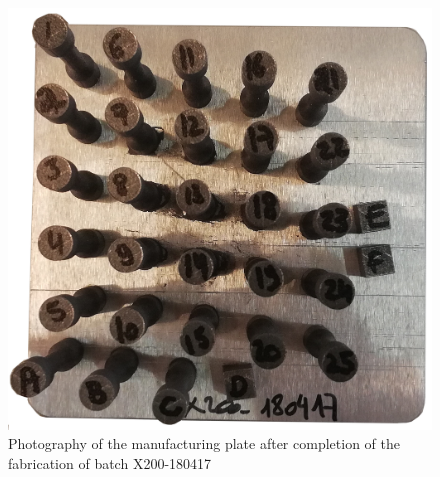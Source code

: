 \begin{figure}[h!]
\centering
\includegraphics[scale=0.22]{Images/180417-real}
\decoRule
\caption[Photography of the manufacturing plate after completion of the fabrication of batch X200-180417]{Photography of the manufacturing plate after completion of the fabrication of batch X200-180417}
\label{fig:180417-real}
\end{figure}



